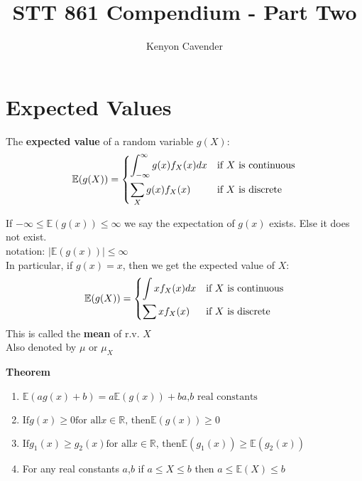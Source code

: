 \documentclass[14pt, oneside, letterpaper]{notes}
\begin{document}
\title{STT 861 Compendium - Part Two}
\author{Kenyon Cavender}
\maketitle

\section*{Expected Values}

\begin{mydef}
	The \textbf{expected value} of a random variable $g(X)$: \\
	\[
	\mathbb{E}(g(X)) = 
		\begin{dcases}
			\int_{-\infty}^{\infty} g(x)f_X(x)dx 
			& \text{if $X$ is continuous} \\			
			\sum_{X}g(x)f_X(x)
			& \text{if $X$ is discrete}
		\end{dcases}
	\]
\end{mydef}

\begin{remark}
If $-\infty \leq \mathbb{E}(g(x)) \leq \infty$ we say the
expectation of $g(x)$ exists.  Else it does not exist. \\
\indent notation: $\left| \mathbb{E}(g(x)) \right| 
\leq \infty$ \\
\indent In particular, if $g(x) = x$, then we get the expected
value of $X$: \\
	\[
	\mathbb{E}(g(X)) = 
		\begin{dcases}
			\int xf_X(x)dx 
			& \text{if $X$ is continuous} \\			
			\sum xf_X(x)
			& \text{if $X$ is discrete}
		\end{dcases}
	\]
\indent This is called the \textbf{mean} of r.v. $X$ \\
\indent Also denoted by $\mu$ or $\mu_X$
\end{remark}

\begin{remark} \textbf{Theorem} \\
\begin{enumerate}
	\item $\mathbb{E}(ag(x) + b) = a\mathbb{E}(g(x)) + b
		\text{$a$,$b$ real constants}$
	\item $\text{If} g(x) \geq 0 \text{for all} x \in 
		\mathbb{R} \text{, then} \mathbb{E}(g(x)) \geq 0$
	\item $\text{If} g_1(x) \geq g_2(x) \text{for all} 
		x \in \mathbb{R} \text{, then} 
		\mathbb{E}(g_1(x)) \geq \mathbb{E}(g_2(x))$
	\item For any real constants $a$,$b$ if $a \leq X 
		\leq b$ then $a \leq \mathbb{E}(X) \leq b$

\end{enumerate}
\end{remark}
\end{document}
